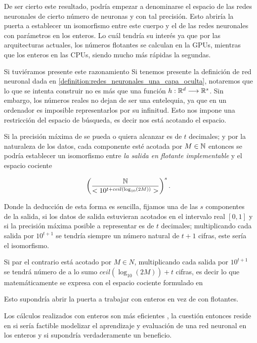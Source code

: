 De ser cierto este resultado, podría empezar a denominarse el espacio 
de las redes neuronales de cierto número de neuronas y con tal
 precisión. Esto abriría la puerta a establecer un isomorfismo entre este cuerpo y el de las redes neuronales con parámetros en los 
 enteros.  Lo cuál tendría su interés ya que por las arquitecturas 
 actuales, los números flotantes se calculan en la GPUs, mientras que los enteros en las CPUs, siendo mucho más rápidas la segundas. 

Si tuviéramos presente este razonamiento 
Si tenemos presente la definición de red neuronal dada en \ref{definition:redes_neuronales_una_capa_oculta}, notaremos que lo que se intenta construir no es más que una función $h: \mathbb{R}^d \longrightarrow \mathbb{R}^s$. Sin embargo, los números reales no dejan de ser una entelequia, ya que en un ordenador es imposible representarlos por su infinitud. Esto nos impone una restricción del espacio de búsqueda, es decir nos está acotando el espacio. 

 Si la precisión máxima de se pueda o quiera alcanzar es de $t$ decimales;
 y por la naturaleza de los datos,
 cada componente esté acotada por $M \in \mathbb{N}$
 entonces se podría 
establecer un isomorfismo entre \textit{la salida en flotante implementable} y el espacio cociente 

\begin{equation}%
    \left( \frac{\N}{<10^{t + ceil( \log_{10}(2 M))}>} \right)^s. 
\end{equation}


Donde la deducción de esta forma es sencilla, 
fijamos una de las $s$ componentes de la salida, si los datos de salida estuvieran acotados en el 
intervalo real $[0,1]$ y si la precisión máxima 
posible a representar es de $t$ decimales; 
multiplicando cada salida por $10^{t+1}$ se tendría siempre un número natural de $t+1$ cifras, este sería el isomorfismo. 

Si par el contrario está acotado por $M \in N$, multiplicando cada salida por $10^{t+1}$ se tendrá número de a lo sumo $ceil(\log_{10}(2 M))+ t$ cifras, es decir lo que matemáticamente se expresa con el espacio cociente formulado en
 
Esto supondría abrir la puerta a trabajar con enteros en vez de con flotantes. 

Los cálculos realizados con enteros son más eficientes %
, la cuestión entonces reside en si sería factible modelizar el aprendizaje y evaluación de una red neuronal en los enteros 
y si supondría verdaderamente un beneficio. 
